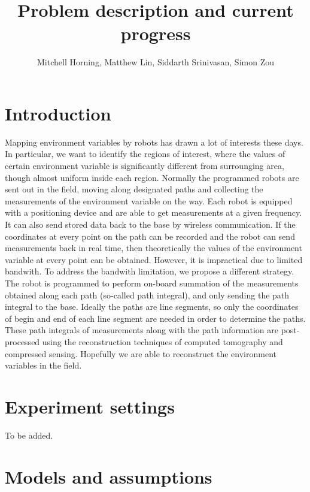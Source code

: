 \documentclass[english]{article}\usepackage[]{graphicx}\usepackage[]{color}
\begin{document}
\title{Problem description and current progress}


\author{Mitchell Horning, Matthew Lin, Siddarth Srinivasan, Simon Zou}

\maketitle

\section{Introduction}

Mapping environment variables by robots has drawn a lot of interests
these days. In particular, we want to identify the regions of interest,
where the values of certain environment variable is significantly
different from surrounging area, though almost uniform inside each
region. Normally the programmed robots are sent out in the field,
moving along designated paths and collecting the measurements of the
environment variable on the way. Each robot is equipped with a positioning
device and are able to get measurements at a given frequency. It can
also send stored data back to the base by wireless communication.
If the coordinates at every point on the path can be recorded and
the robot can send measurements back in real time, then theoretically
the values of the environment variable at every point can be obtained.
However, it is impractical due to limited bandwith. To address the
bandwith limitation, we propose a different strategy. The robot is
programmed to perform on-board summation of the measurements obtained
along each path (so-called path integral), and only sending the path
integral to the base. Ideally the paths are line segments, so only
the coordinates of begin and end of each line segment are needed in
order to determine the paths. These path integrals of measurements
along with the path information are post-processed using the reconstruction
techniques of computed tomography and compressed sensing. Hopefully
we are able to reconstruct the environment variables in the field.


\section{Experiment settings}

To be added.


\section{Models and assumptions}
\end{document}
